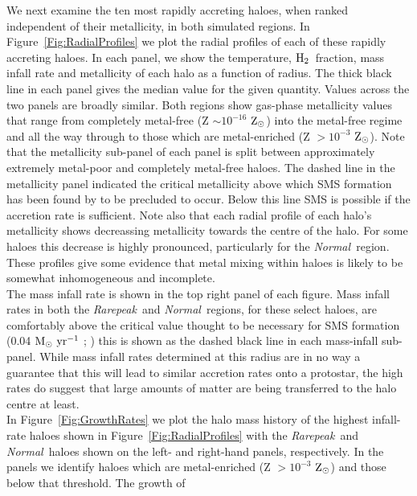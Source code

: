 \documentclass[graphics, twocolumn, usenatbib]{mn2e}
\newcommand{\msolaryr} {$\rm{M_{\odot}~yr^{-1}}~$}
\newcommand{\zsolarc} {$\rm{Z_{\odot}}$}
\newcommand{\molH} {$\rm{H_2}$~}
\newcommand{\rarepeak} {\textit{Rarepeak~}}
\newcommand{\normal} {\textit{Normal~}}
\begin{document}
\indent We next examine the ten most rapidly accreting haloes, when ranked independent of their metallicity, in both simulated regions.
In Figure~\ref{Fig:RadialProfiles} we plot the radial profiles of each of these rapidly
accreting haloes.
In each panel, we show the temperature, \molH fraction, mass infall rate and
metallicity of each halo as a function of radius. 
The thick black line in each panel gives the
median value for the given quantity. Values across the two panels are broadly similar. Both regions
show gas-phase metallicity values that range from completely metal-free (Z $\sim 10^{-16}$ \zsolarc)
into the metal-free regime and all the way through to those which are metal-enriched (Z $> 10^{-3}$
\zsolarc). Note that the metallicity sub-panel of each panel
is split between approximately extremely metal-poor and completely metal-free haloes. The dashed
line in the metallicity panel indicated the critical metallicity above which SMS formation
has been found by \cite{Chon_2020} to be precluded to occur. Below this line SMS is possible if the
accretion rate is sufficient. Note also that each radial profile of each halo's  metallicity shows
decreassing metallicity towards the centre of the halo. For some haloes this decrease is highly
pronounced, particularly for the \normal region. These profiles give some evidence that metal
mixing within haloes is likely to be somewhat inhomogeneous and incomplete. \\
\indent The mass infall rate is shown in the top right panel of each figure. 
Mass infall rates in both the \rarepeak and \normal regions, for these select haloes, are
comfortably above the critical value thought to be necessary for SMS formation (0.04
\msolaryr; \citealt{Sakurai_2016}) this is shown as the dashed black line in each mass-infall sub-panel.
While mass infall rates determined at this radius are in no
way a guarantee that this will lead to similar accretion rates onto a protostar, the high rates do
suggest that large amounts of matter are being transferred to the halo centre at least. \\
\indent In Figure~\ref{Fig:GrowthRates} we plot the halo mass history of the highest
infall-rate haloes shown in Figure~\ref{Fig:RadialProfiles} with the \rarepeak and \normal haloes
shown on the left- and right-hand panels, respectively. In the panels we identify haloes which
are metal-enriched (Z $> 10^{-3}$ \zsolarc) and those below that threshold. The growth of
\end{document}
